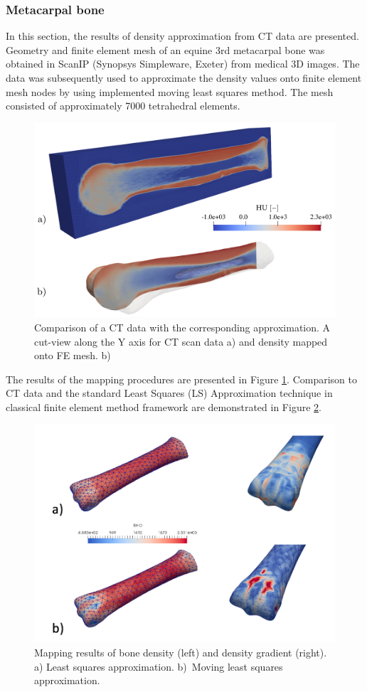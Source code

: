 \documentclass[11pt]{acmeArticle}
\numberwithin{equation}{section}
\begin{document}
\subsubsection{Metacarpal bone}
In this section, the results of density approximation from CT data are presented. Geometry and finite element mesh of an equine 3rd metacarpal bone was obtained in ScanIP (Synopsys Simpleware, Exeter) from medical 3D images. The data was subsequently used to approximate the density values onto finite element mesh nodes by using implemented moving least squares method. The mesh consisted of approximately 7000 tetrahedral elements. \\
\begin{figure}
	\centering
	\includegraphics[width=0.5\linewidth]{Figures/mwlsmapping_cross.png}
	\caption{Comparison of a CT data with the corresponding approximation. A cut-view along the Y axis for CT scan data a) and density mapped onto FE mesh. b)}
	\label{fig:mwlsmapping_cross}
\end{figure}
The results of the mapping procedures are presented in Figure \ref{fig:mwlsmapping_cross}. Comparison to CT data and the standard Least Squares (LS) Approximation technique in classical finite element method framework are demonstrated in Figure \ref{fig:mwlsmappingcomparisons}.
\begin{figure}
	\centering
	\includegraphics[width=0.7\linewidth]{Figures/mwls_mapping_comparisons.png}
	\caption{Mapping results of bone density (left) and density gradient (right). a) Least squares approximation. b)~Moving least squares approximation.}
	\label{fig:mwlsmappingcomparisons}
\end{figure}
\end{document}
